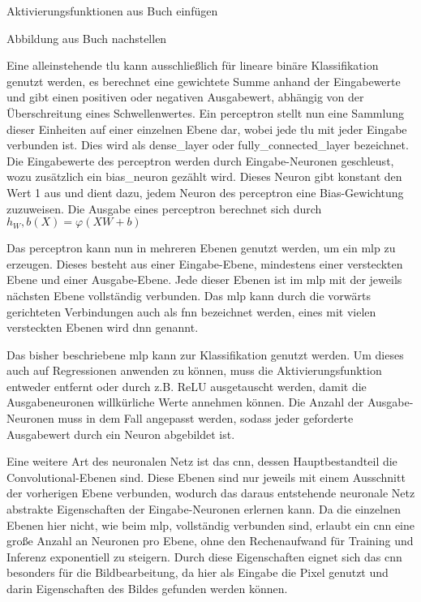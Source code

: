 Aktivierungsfunktionen aus Buch einfügen

Abbildung aus Buch nachstellen

Eine alleinstehende \gls{tlu} kann ausschließlich für lineare binäre Klassifikation genutzt werden, es berechnet eine gewichtete Summe anhand der Eingabewerte und gibt einen positiven oder negativen Ausgabewert, abhängig von der Überschreitung eines Schwellenwertes. Ein \gls{perceptron} stellt nun eine Sammlung dieser Einheiten auf einer einzelnen Ebene dar, wobei jede \gls{tlu} mit jeder Eingabe verbunden ist. Dies wird als \gls{dense_layer} oder \gls{fully_connected_layer} bezeichnet. Die Eingabewerte des \gls{perceptron} werden durch Eingabe-Neuronen geschleust, wozu zusätzlich ein \gls{bias_neuron} gezählt wird. Dieses Neuron gibt konstant den Wert 1 aus und dient dazu, jedem Neuron des \gls{perceptron} eine Bias-Gewichtung zuzuweisen. Die Ausgabe eines \gls{perceptron} berechnet sich durch \(h_W,b(X)=φ(XW+b)\) \cite[S. 284 ff.]{Geron2019}

Das \gls{perceptron} kann nun in mehreren Ebenen genutzt werden, um ein \gls{mlp} zu erzeugen. Dieses besteht aus einer Eingabe-Ebene, mindestens einer versteckten Ebene und einer Ausgabe-Ebene. Jede dieser Ebenen ist im \gls{mlp} mit der jeweils nächsten Ebene vollständig verbunden. Das \gls{mlp} kann durch die vorwärts gerichteten Verbindungen auch als \gls{fnn} bezeichnet werden, eines mit vielen versteckten Ebenen wird \gls{dnn} genannt. \cite[S. 284 ff.]{Geron2019}

Das bisher beschriebene \gls{mlp} kann zur Klassifikation genutzt werden. Um dieses auch auf Regressionen anwenden zu können, muss die Aktivierungsfunktion entweder entfernt oder durch z.B. ReLU ausgetauscht werden, damit die Ausgabeneuronen willkürliche Werte annehmen können. Die Anzahl der Ausgabe-Neuronen muss in dem Fall angepasst werden, sodass jeder geforderte Ausgabewert durch ein Neuron abgebildet ist. \cite[S. 292 ff.]{Geron2019}

Eine weitere Art des neuronalen Netz ist das \gls{cnn}, dessen Hauptbestandteil die Convolutional-Ebenen sind. Diese Ebenen sind nur jeweils mit einem Ausschnitt der vorherigen Ebene verbunden, wodurch das daraus entstehende neuronale Netz abstrakte Eigenschaften der Eingabe-Neuronen erlernen kann. Da die einzelnen Ebenen hier nicht, wie beim \gls{mlp}, vollständig verbunden sind, erlaubt ein \gls{cnn} eine große Anzahl an Neuronen pro Ebene, ohne den Rechenaufwand für Training und Inferenz exponentiell zu steigern. Durch diese Eigenschaften eignet sich das \gls{cnn} besonders für die Bildbearbeitung, da hier als Eingabe die Pixel genutzt und darin Eigenschaften des Bildes gefunden werden können. \cite[S. 447 f.]{Geron2019}


